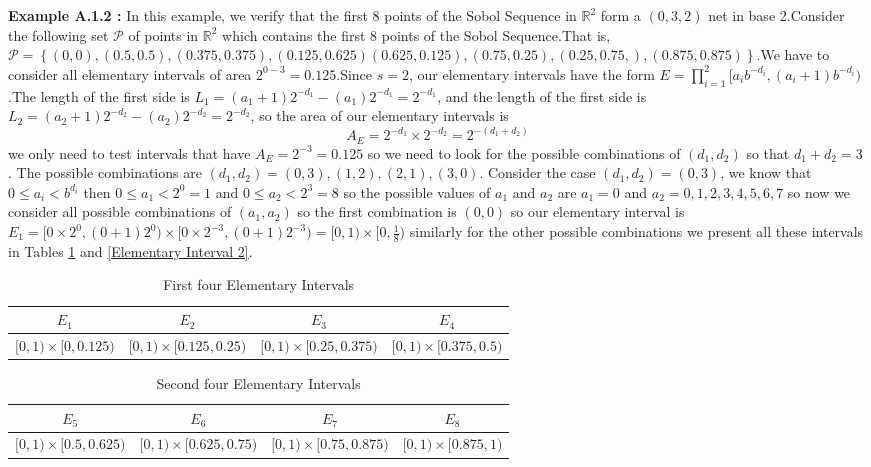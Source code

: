 \documentclass{article}
\theoremstyle{definition}
\begin{document}
\begin{appendices}
\noindent\textbf{ Example A.1.2 :}
In this example, we verify that the first 8 points of the Sobol Sequence in $\mathbb{R}^2$ form a $(0,3,2)$ net in base 2.Consider the following set $\mathcal{P}$ of points in $\mathbb{R}^2$ which contains the first 8 points of the Sobol Sequence.That is, \(\mathcal{P}=\left\{(0,0), (0.5,0.5),(0.375,0.375),(0.125,0.625)(0.625,0.125),(0.75,0.25),(0.25,0.75,),(0.875,0.875)\right\}\).We have to consider all elementary intervals of area \(2^{0-3}=0.125\).Since \( s=2\), our elementary intervals have the form \(E=\prod_{i=1}^2[a_ib^{-d_i},(a_i+1)b^{-d_i})\).The length of the first side is \(L_1=(a_1+1)2^{-d_1} - (a_1)2^{-d_1}=2^{-d_1}\), and the length of the first side is \(L_2=(a_2+1)2^{-d_2} - (a_2)2^{-d_2}=2^{-d_2}\), so the area of our elementary intervals is\begin{equation}
    A_E=2^{-d_1}\times2^{-d_2}=2^{-(d_1+d_2)}
\end{equation} 
we only need to test intervals that have $A_E=2^{-3}=0.125$ so we need to look for the possible combinations of $(d_1,d_2)$ so that $d_1+d_2=3$ . The possible combinations are \((d_1,d_2)=(0,3),(1,2),(2,1),(3,0)\).
Consider the case 
 \((d_1,d_2)=(0,3)\), we know that \(0\leq a_i<b^{d_i}\) then \(0\leq a_1< 2^{0}=1\) and \(0\leq a_2< 2^{3}=8\) so the possible values of \(a_1\) and \(a_2\) are \( a_1=0\) and \(a_2=0,1,2,3,4,5,6,7\)
so now we consider all possible combinations of $(a_1,a_2)$ so the first combination is $(0,0)$ so our elementary interval is \(E_1=[0\times 2^0,(0+1)2^{0})\times[0\times 2^{-3},(0+1)2^{-3})=[0,1)\times [0,\frac{1}{8}) \) similarly for the other possible combinations we present all these intervals in Tables \ref{Elementary Interval 1} and \ref{Elementary Interval 2}.
\begin{table}[H]
\centering
\begin{tabular}{cccc}
\toprule
$E_1$ & $E_2$ & $E_3$ & $E_4$ \\
\midrule
$[0,1)\times[0,0.125)$ &
$[0,1)\times[0.125,0.25)$ &
$[0,1)\times[0.25,0.375)$ &
$[0,1)\times[0.375,0.5)$ \\
\bottomrule
\end{tabular}
\caption{First four Elementary Intervals}
\label{Elementary Interval 1}
\end{table}
\begin{table}[H]
\centering
\begin{tabular}{cccc}
\toprule
$E_5$ & $E_6$ & $E_7$ & $E_8$ \\
\midrule
$[0,1)\times[0.5,0.625)$ &
$[0,1)\times[0.625,0.75)$ &
$[0,1)\times[0.75,0.875)$ &
$[0,1)\times[0.875,1)$ \\
\bottomrule
\end{tabular}
\caption{Second four Elementary Intervals}


\end{table}
\end{appendices}
\end{document}
